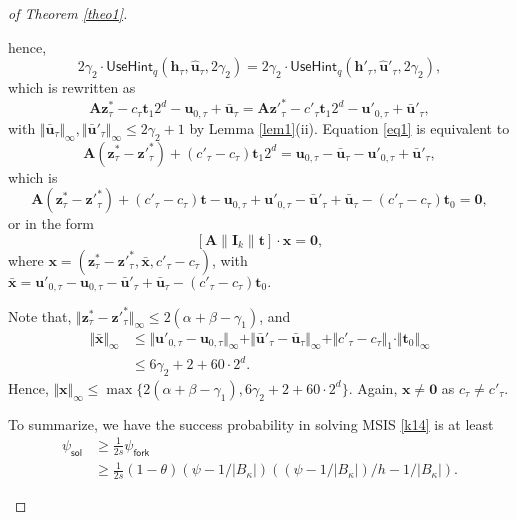 \documentclass[conference]{IEEEtran}
\newtheorem{proof}{Proof}
\begin{document}
\begin{proof}[of Theorem \ref{theo1}]
\begin{enumerate}
			hence, $$2\gamma_2\cdot \textsf{UseHint}_q(\mathbf{h}_\tau,\widehat{\mathbf{u}}_\tau,2\gamma_2)=2\gamma_2\cdot \textsf{UseHint}_q(\mathbf{h}'_\tau,\widehat{\mathbf{u}}'_\tau,2\gamma_2),$$
			which is rewritten as
			\begin{equation}\label{eq1}
			\mathbf{A}\mathbf{z}^*_\tau-c_\tau\mathbf{t}_{1}2^d-\mathbf{u}_{0,\tau}+\bar{\mathbf{u}}_\tau =\mathbf{A}\mathbf{z}'^*_\tau-c'_\tau\mathbf{t}_{1}2^d-\mathbf{u}'_{0,\tau}+\bar{\mathbf{u}}'_\tau,
			\end{equation}
			with $\Vert \bar{\mathbf{u}}_\tau \Vert_{\infty}, \Vert \bar{\mathbf{u}}'_\tau \Vert_{\infty} \leq 2\gamma_2+1$ by Lemma \ref{lem1}(ii). Equation \eqref{eq1} is equivalent to
			\begin{equation*}\label{eq2}
			\mathbf{A}(\mathbf{z}^*_\tau-\mathbf{z}'^*_\tau)+(c'_\tau-c_\tau)\mathbf{t}_{1}2^d =\mathbf{u}_{0,\tau}-\bar{\mathbf{u}}_\tau-\mathbf{u}'_{0,\tau}+\bar{\mathbf{u}}'_\tau,
			\end{equation*}
			which is 
			\begin{equation*}\label{eq7}
			\mathbf{A}(\mathbf{z}^*_\tau-\mathbf{z}'^*_\tau)+(c'_\tau-c_\tau)\mathbf{t}-\mathbf{u}_{0,\tau}+\mathbf{u}'_{0,\tau}-\bar{\mathbf{u}}'_\tau+\bar{\mathbf{u}}_\tau-(c'_\tau-c_\tau)\mathbf{t}_0=\textbf{0},
			\end{equation*}
			or in the form 
			$$[\mathbf{A}\|\mathbf{I}_{k} \|\mathbf{t}]\cdot \mathbf{x}=\textbf{0},$$
			where $\mathbf{x}=(\mathbf{z}^*_\tau-\mathbf{z}'^*_\tau, \bar{\mathbf{x}}, c'_\tau-c_\tau)$, with $ \bar{\mathbf{x}}=\mathbf{u}'_{0,\tau}-\mathbf{u}_{0,\tau}-\bar{\mathbf{u}}'_\tau+\bar{\mathbf{u}}_\tau-(c'_\tau-c_\tau)\mathbf{t}_0.$
			
			Note that, $\Vert \mathbf{z}^*_\tau-\mathbf{z}'^*_\tau \Vert_{\infty} \leq 2(\alpha+\beta-\gamma_1)$, and 
			\begin{align*}
			\Vert \bar{\mathbf{x}} \Vert_{\infty} &\leq \Vert \mathbf{u}'_{0,\tau}-\mathbf{u}_{0,\tau} \Vert_{\infty}+\Vert \bar{\mathbf{u}}'_\tau-\bar{\mathbf{u}}_\tau\Vert_{\infty}+\Vert c'_\tau-c_\tau\Vert_1\cdot \Vert \mathbf{t}_0 \Vert_{\infty} \\
			&\leq 6\gamma_2+2+60 \cdot 2^d.
			\end{align*}
			Hence, $\Vert \mathbf{x} \Vert_{\infty}  \leq \max \{2(\alpha+\beta-\gamma_1), 6\gamma_2+2+60 \cdot 2^d\}$.
			Again, $\mathbf{x} \neq \textbf{0}$ as $c_\tau \neq c'_\tau $. 
			
			To summarize, we have the success probability in solving \textsf{MSIS} \eqref{k14} is at least \begin{equation*}
			\begin{split}
		\psi_{\textsf{sol}} &\geq \frac{1}{2s}\psi_{\textsf{fork}} \\
		&\geq \frac{1}{2s}(1-\theta) (\psi-1/|B_{\kappa}|)((\psi-1/|B_{\kappa}|)/h-1/|B_{\kappa}|).
			\end{split}
			\end{equation*}
			

\end{enumerate}
\end{proof}
\end{document}
